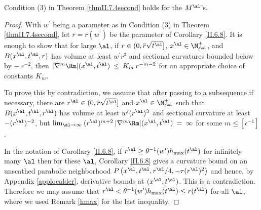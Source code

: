 \begin{lemma}
  \label{lem:kl-thin-part-graph-manifold-thick-thin-geometry-lemma}
 \label{condition}
Condition (3) in Theorem \ref{thmII.7.4second} holds for the $M^\al$'s.
\end{lemma}
\begin{proof}
With $w^\prime$ being a parameter as in
Condition (3) in Theorem \ref{thmII.7.4second},
let $\overline{r} = \overline{r}(w^\prime)$ be the parameter of Corollary \ref{II.6.8}.
It is enough to show that for large $\al$, if $r \in (0, \overline{r} \sqrt{t^\al}]$,
$x^\al \in \M_{t^\al}^+$, and $B(x^\al, t^\al, r)$
has volume at least $w^\prime r^3$ and sectional curvatures
bounded below by $- \: r^{-2}$, then $|\nabla^m \Rm|(x^\al, t^\al) \: \le \:
K_m \: r^{-m-2}$ for an appropriate choice of constants $K_m$.

To prove this by contradiction, we  assume that after passing
to a subsequence if necessary, there are  $r^\al\in (0,\overline{r} \sqrt{t^\al}]$
and $x^\al \in \M_{t^\al}^+$ such that $B(x^\al, t^\al,r^\al)$ has
volume
at least $w^\prime (r^\al)^3$ and sectional curvature at least
$-(r^\al)^{-2}$, but $\lim_{\al \rightarrow \infty} \:
(r^\al)^{m+2} \: |\nabla^m \Rm|(x^\al, t^\al) \: = \:
\infty$
for some $m \le [\epsilon^{-1}]$.

In the notation of Corollary \ref{II.6.8}, if
$r^\al \ge \theta^{-1}(w^\prime) h_{\max}(t^\al)$ for infinitely many $\al$
then for these $\al$, Corollary \ref{II.6.8} gives a curvature bound on an unscathed
parabolic neighborhood
$P \left( x^\al, t^\al, r^\al/4, - \tau (r^\al)^2 \right)$ and hence,
by Appendix \ref{applocalder}, derivative bounds at $(x^\al, t^\al)$.
This is a contradiction.  Therefore we may assume that
$r^\al < \theta^{-1}(w^\prime) h_{\max}(t^\al) \le r(t^\al)$ for all $\al$,
where we used Remark \ref{hmax} for the last inequality.


\end{proof}
